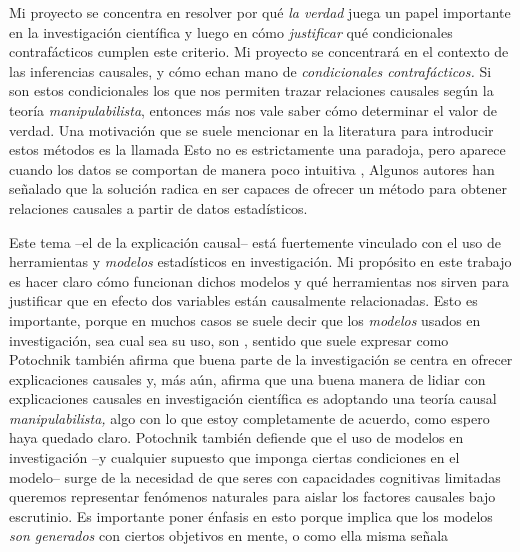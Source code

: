 Mi proyecto se concentra en resolver por qué \emph{la verdad} juega
un papel importante en la investigación científica y luego en cómo
\emph{justificar} qué condicionales contrafácticos cumplen este
criterio. Mi proyecto se concentrará en el contexto de las
inferencias causales, y cómo echan mano de \emph{condicionales
 contrafácticos.} Si son estos condicionales los que nos permiten
trazar relaciones causales según la teoría \emph{manipulabilista},
entonces más nos vale saber cómo determinar el valor de verdad. Una
motivación que se suele mencionar en la literatura para introducir
estos métodos es la llamada  Esto no es
estrictamente una paradoja, pero aparece cuando los datos se
comportan de manera poco intuitiva
\parencite[p.~13]{Hajek2016-HAJOHO}, Algunos autores han señalado que
la solución radica en ser capaces de ofrecer un método para obtener
relaciones causales a partir de datos estadísticos.

Este tema --el de la explicación causal-- está fuertemente vinculado
con el uso de herramientas y \emph{modelos} estadísticos en
investigación. Mi propósito en este trabajo es hacer claro cómo
funcionan dichos modelos y qué herramientas nos sirven para
justificar que en efecto dos variables están causalmente
relacionadas. Esto es importante, porque en muchos casos se suele
decir que los \emph{modelos} usados en investigación, sea cual sea su
uso, son , sentido que suele expresar como
 \parencite[p.~18, énfasis
 agregado]{Potochnik2017-POTIAT-3} Potochnik también afirma que buena
parte de la investigación se centra en ofrecer explicaciones causales
y, más aún, afirma que una buena manera de lidiar con explicaciones
causales en investigación científica es adoptando una teoría causal
\emph{manipulabilista,} algo con lo que estoy completamente de
acuerdo, como espero haya quedado claro. Potochnik también defiende
que el uso de modelos en investigación --y cualquier supuesto que
imponga ciertas condiciones en el modelo-- surge de la necesidad de
que seres con capacidades cognitivas limitadas queremos representar
fenómenos naturales para aislar los factores causales bajo
escrutinio. Es importante poner énfasis en esto porque implica que
los modelos \emph{son generados} con ciertos objetivos en mente, o
como ella misma señala 

